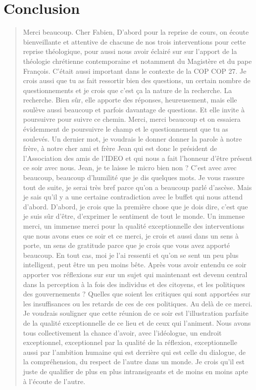 \section{Conclusion}

\begin{quote}
    Merci beaucoup. Cher Fabien, D'abord pour la reprise de cours, on écoute bienveillante et attentive de chacune de nos trois interventions pour cette reprise théologique, pour aussi nous avoir éclairé sur sur l'apport de la théologie chrétienne contemporaine et notamment du Magistère et du pape François. C'était aussi important dans le contexte de la COP COP 27. Je crois aussi que tu as fait ressortir bien des questions, un certain nombre de questionnements et je crois que c'est ça la nature de la recherche.
La recherche. Bien sûr, elle apporte des réponses, heureusement, mais elle soulève aussi beaucoup et parfois davantage de questions. Et elle invite à poursuivre pour suivre ce chemin. Merci, merci beaucoup et on essaiera évidemment de poursuivre le champ et le questionnement que tu as soulevés. Un dernier mot, je voudrais le donner donner la parole à notre frère, à notre cher ami et frère Jean qui est donc le président de l'Association des amis de l'IDEO et qui nous a fait l'honneur d'être présent ce soir avec nous.
Jean, je te laisse le micro bien non ? C'est avec avec beaucoup, beaucoup d'humilité que je dis quelques mots. Je vous rassure tout de suite, je serai très bref parce qu'on a beaucoup parlé d'ascèse. Mais je sais qu'il y a une certaine contradiction avec le buffet qui nous attend d'abord. D'abord, je crois que la première chose que je dois dire, c'est que je suis sûr d'être, d'exprimer le sentiment de tout le monde.
Un immense merci, un immense merci pour la qualité exceptionnelle des interventions que nous avons eues ce soir et ce merci, je crois et aussi dans un sens à porte, un sens de gratitude parce que je crois que vous avez apporté beaucoup. En tout cas, moi je l'ai ressenti et qu'on se sent un peu plus intelligent, peut être un peu moins bête.
Après vous avoir entendu ce soir apporter vos réflexions sur sur un sujet qui maintenant est devenu central dans la perception à la fois des individus et des citoyens, et les politiques des gouvernements ? Quelles que soient les critiques qui sont apportées sur les insuffisances ou les retards de ces de ces politiques. Au delà de ce merci. Je voudrais souligner que cette réunion de ce soir est l'illustration parfaite de la qualité exceptionnelle de ce lieu et de ceux qui l'animent.
Nous avons tous collectivement la chance d'avoir, avec l'idéologue, un endroit exceptionnel, exceptionnel par la qualité de la réflexion, exceptionnelle aussi par l'ambition humaine qui est derrière qui est celle du dialogue, de la compréhension, du respect de l'autre dans un monde. Je crois qu'il est juste de qualifier de plus en plus intransigeants et de moins en moins apte à l'écoute de l'autre.

\end{quote}
